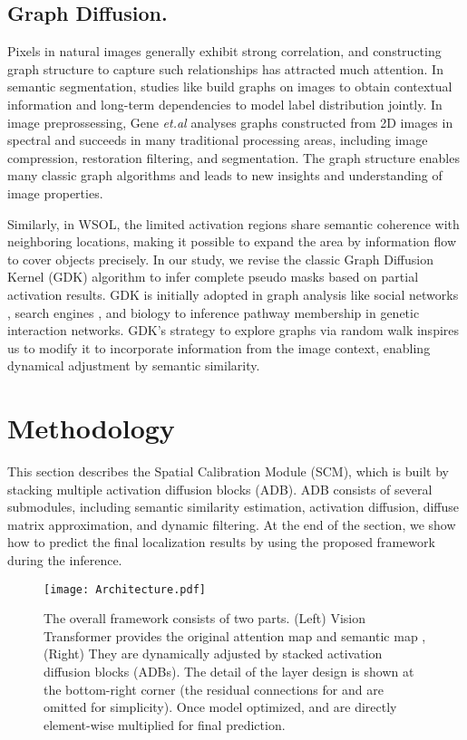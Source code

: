 \documentclass[runningheads]{llncs}
\begin{document}
\subsection{Graph Diffusion.} Pixels in natural images generally exhibit strong correlation, and constructing graph structure to capture such relationships has attracted much attention. In semantic segmentation, studies like \cite{DBLP:journals/corr/LiuLLLT16,DBLP:journals/corr/LiuLLLT15} build graphs on images to obtain contextual information and long-term dependencies to model label distribution jointly. 
In image preprossessing, Gene \textit{et.al} \cite{cheung2018graph} analyses graphs constructed from 2D images in spectral and succeeds in many traditional processing areas, including image compression, restoration filtering, and segmentation. The graph structure enables many classic graph algorithms and leads to new insights and understanding of image properties.  

Similarly, in WSOL, the limited activation regions share semantic coherence with neighboring locations, making it possible to expand the area by information flow to cover objects precisely. In our study, we revise the classic Graph Diffusion Kernel (GDK) algorithm \cite{kondor2002diffusion} to infer complete pseudo masks based on partial activation results. GDK is initially adopted in graph analysis like social networks \cite{bourigault2014learning}, search engines \cite{ma2011mining}, and biology \cite{Yan2008FENet} to inference pathway membership in genetic interaction networks. GDK's strategy to explore graphs via random walk inspires us to modify it to incorporate information from the image context, enabling dynamical adjustment by semantic similarity. 


\section{Methodology}
This section describes the Spatial Calibration Module (SCM), which is built by stacking multiple activation diffusion blocks (ADB). ADB consists of several submodules, including semantic similarity estimation, activation diffusion, diffuse matrix approximation, and dynamic filtering. At the end of the section, we show how to predict the final localization results by using the proposed framework during the inference.

\begin{figure}[t]
\centering
\texttt{[image: Architecture.pdf]}
\caption{The overall framework consists of two parts. (Left) Vision Transformer provides the original attention map  and semantic map , (Right) They are dynamically adjusted by stacked activation diffusion blocks (ADBs). The detail of the layer design is shown at the bottom-right corner (the residual connections for  and  are omitted for simplicity). Once model optimized,  and  are directly element-wise multiplied for final prediction.} 
\label{fig:arch}
\end{figure}
\end{document}
